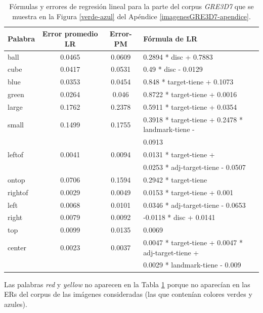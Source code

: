 \begin{table}[h]
\begin{center}
\begin{tabular}{|l|c|c|l|}
\hline
Palabra &Error promedio	LR	& Error-PM	& F\'ormula de LR\\
\hline
ball		 &0.0465   &0.0609	  & 0.2894 * disc + 0.7883\\
\hline
cube		 &0.0417	 &0.0531	  &0.49   * disc - 0.0129\\
\hline
\hline
blue		 &0.0353	 &0.0454	  &0.848  * target-tiene + 0.1073\\
\hline
green		 &0.0264	 &0.046	    &0.8722 * target-tiene + 0.0016\\
\hline
\hline
large		 &0.1762	 &0.2378	  &0.5911 * target-tiene + 0.0354\\
\hline
small		 &0.1499	 &0.1755	  &0.3918 * target-tiene + 0.2478 * landmark-tiene -\\
				 &				 &					&0.0913\\
\hline
\hline
leftof  &0.0041	 &0.0094	  &0.0131 * target-tiene +\\
				 &				 &					&0.0253 * adj-target-tiene - 0.0507\\
\hline
ontop	 &0.0706	 &0.1594	  &0.2942 * target-tiene \\
\hline
rightof &0.0029	 &0.0049	  &0.0153 * target-tiene + 0.001\\
\hline
\hline
left		 &0.0068	 &0.0101	  &0.0346 * adj-target-tiene - 0.0653\\
\hline
right		 &0.0079	 &0.0092	  &-0.0118 * disc + 0.0141\\
\hline
top    &0.0099 	 &0.0135		& 0.0069\\
\hline
center	 &0.0023	 &0.0037	  &0.0047 * target-tiene + 0.0047 * adj-target-tiene +\\
				 &				 &					&0.0029 * landmark-tiene - 0.009\\
\hline
\end{tabular}
\caption{F\'ormulas y errores de regresi\'on lineal para la parte del corpus \textit{GRE3D7} que se muestra en la Figura \ref{verde-azul} del Ap\'endice \ref{imagenesGRE3D7-apendice}.}
\label{tabla-linear-regresion-all}
\end{center}
\end{table}

Las palabras {\it red} y {\it yellow} no aparecen en la Tabla \ref{tabla-linear-regresion-all} porque no aparec\'ian en las ERs del corpus de las im\'agenes consideradas (las que conten\'ian colores verdes y azules).

